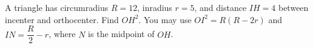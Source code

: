 A triangle has circumradius $R=12$, inradius $r=5$, and distance $IH=4$ between incenter and orthocenter. Find $OH^2$. You may use $OI^2=R(R-2r)$ and $I N = \dfrac{R}{2} - r$, where $N$ is the midpoint of $OH$.

